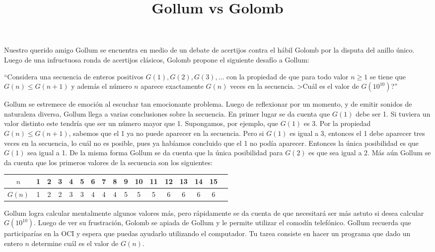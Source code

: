 \documentclass{oci}
\title{Gollum vs Golomb}
\begin{document}
\begin{problemDescription}
Nuestro querido amigo Gollum se encuentra en medio de un debate de acertijos contra el hábil Golomb por la disputa del anillo único.
Luego de una infructuosa ronda de acertijos clásicos, Golomb propone el siguiente desafío a Gollum:

``Considera una secuencia de enteros positivos $G(1), G(2), G(3),\dots$ con la propiedad de que para todo valor $n \geq 1$ se tiene que $G(n) \leq G(n+1)$ y además el número $n$ aparece exactamente $G(n)$ veces en la secuencia. >Cuál es el valor de $G(10^{10})$?''

Gollum se estremece de emoción al escuchar tan emocionante problema.
Luego de reflexionar por un momento, y de emitir sonidos de naturaleza diversa, Gollum llega a varias conclusiones sobre la secuencia.
En primer lugar se da cuenta que $G(1)$ debe ser 1. 
Si tuviera un valor distinto este tendría que ser un número mayor que 1.
Supongamos, por ejemplo, que $G(1)$ es 3.
Por la propiedad $G(n)\leq G(n+1)$, sabemos que el 1 ya no puede aparecer en la secuencia.
Pero si $G(1)$ es igual a 3, entonces el 1 debe aparecer tres veces en la secuencia, lo cuál no es posible, pues ya habíamos concluido que el 1 no podía aparecer.
Entonces la única posibilidad es que $G(1)$ sea igual a 1.
De la misma forma Gollum se da cuenta que la única posibilidad para $G(2)$ es que sea igual a 2.
Más aún Gollum se da cuenta que los primeros valores de la secuencia son los siguientes:
\begin{center}
  \begin{tabular}{c|cccccccccccccccc}
	$n$ & 1 & 2 & 3 & 4 & 5 & 6 & 7 & 8 & 9 & 10 & 11 & 12 & 13 & 14 & 15 \\
  \hline
	$G(n)$ & 1 & 2 & 2 & 3 & 3 & 4 & 4 & 4 & 5 & 5 & 5 & 6 & 6 & 6 & 6 
  \end{tabular}
\end{center}
Gollum logra calcular mentalmente algunos valores más, pero rápidamente se da cuenta de que necesitará ser más astuto si desea calcular $G(10^{10})$.
Luego de ver su frustración, Golomb se apiada de Gollum y le permite utilizar el comodín telefónico.
Gollum recuerda que participarías en la OCI y espera que puedas ayudarlo utilizando el computador.
Tu tarea consiste en hacer un programa que dado un entero $n$ determine cuál es el valor de $G(n)$.
\end{problemDescription}
\end{document}
